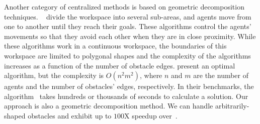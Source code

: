 Another category of centralized methods is based on geometric decomposition techniques. ~\cite{dresner2008multiagent,calinescu2008reconfigurations,vsvestka1998coordinated} divide the workspace into several sub-areas, and agents move from one to another until they reach their goals. These algorithms control the agents' movements so that they avoid each other when they are in close proximity. While these algorithms work in a continuous workspace, the boundaries of this workspace are limited to polygonal shapes and the  complexity of the algorithms increases as a function of the number of  obstacle edges. 
\cite{DBLP:journals/corr/SoloveyYZH15} present  an optimal algorithm, but the complexity is $O(n^2m^2)$, where $n$ and $m$ are the number of agents and the number of obstacles' edges, respectively. In their benchmarks, the algorithm~\cite{DBLP:journals/corr/SoloveyYZH15} takes hundreds or thousands of seconds to calculate a solution. Our approach is also a geometric decomposition method. We can handle arbitrarily-shaped obstacles and exhibit up to $100$X speedup over~\cite{DBLP:journals/corr/SoloveyYZH15}.
 


 